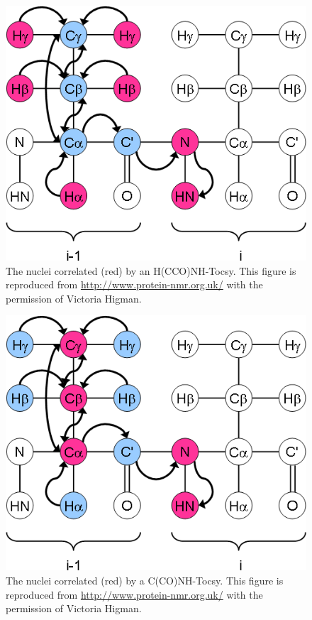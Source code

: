 \begin{figure}
  \includegraphics[scale=0.75]{figures/ccpn_hcconhtocsy}
  \caption[The nuclei correlated by an H(CCO)NH-Tocsy.]
          {The nuclei correlated (red) by an H(CCO)NH-Tocsy.
           This figure is reproduced from \url{http://www.protein-nmr.org.uk/}
           with the permission of Victoria Higman.}
  \label{ccpn_hcconhtocsy}
\end{figure}

\begin{figure}
  \includegraphics[scale=0.75]{figures/ccpn_cconhtocsy}
  \caption[The nuclei correlated by a C(CO)NH-Tocsy.]
          {The nuclei correlated (red) by a C(CO)NH-Tocsy.
           This figure is reproduced from \url{http://www.protein-nmr.org.uk/}
           with the permission of Victoria Higman.}
  \label{ccpn_cconhtocsy}
\end{figure}

